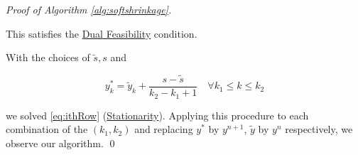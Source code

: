 \begin{proof}[Proof of Algorithm \ref{alg:softshrinkage}]
\begin{enumerate}
                    This satisfies the \underline{Dual Feasibility} condition.



                \end{enumerate}

                With the choices of $\tilde{s}, s$ and

                    $$y^{\ast}_{k} = \tilde{y}_{k} + \frac{s - \tilde{s}}{k_{2} - k_{1} + 1} \,\,\,\,\,\, \forall k_{1} \le k \le k_{2}$$

                we solved \ref{eq:ithRow} (\underline{Stationarity}). Applying this procedure to each combination of the $(k_{1}, k_{2})$ and replacing $y^{\ast}$ by $y^{n+1}$, $\tilde{y}$ by $y^{n}$ respectively, we observe our algorithm.
                \qed
            \end{proof}


